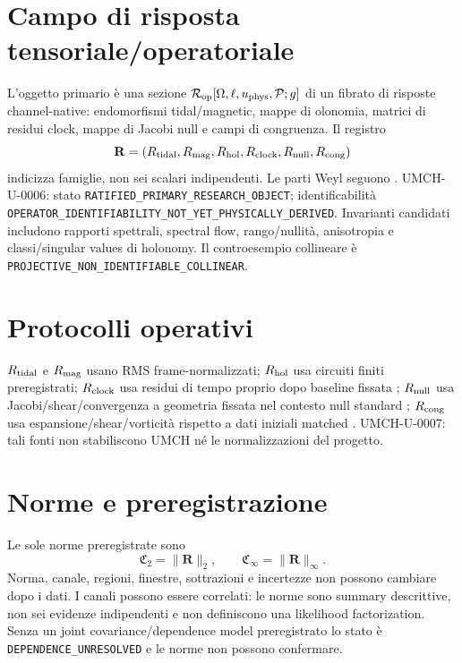 \documentclass[11pt,a4paper]{article}
\begin{document}
\section{Campo di risposta tensoriale/operatoriale}\label{sec:u-response}
L'oggetto primario è una sezione $\mathcal R_{\rm op}[\Omega,\ell,u_{\rm phys},\mathcal P;g]$ di un fibrato di risposte channel-native: endomorfismi tidal/magnetic, mappe di olonomia, matrici di residui clock, mappe di Jacobi null e campi di congruenza. Il registro
\begin{equation}\label{eq:u-vector}\mathbf R=(R_{\rm tidal},R_{\rm mag},R_{\rm hol},R_{\rm clock},R_{\rm null},R_{\rm cong})\end{equation}
indicizza famiglie, non sei scalari indipendenti. Le parti Weyl seguono \cite{Bonnor1995,MaartensBassett1998}. UMCH-U-0006: stato \verb|RATIFIED_PRIMARY_RESEARCH_OBJECT|; identificabilità \verb|OPERATOR_IDENTIFIABILITY_NOT_YET_PHYSICALLY_DERIVED|. Invarianti candidati includono rapporti spettrali, spectral flow, rango/nullità, anisotropia e classi/singular values di holonomy. Il controesempio collineare è \verb|PROJECTIVE_NON_IDENTIFIABLE_COLLINEAR|.

\section{Protocolli operativi}\label{sec:u-protocols}
$R_{\rm tidal}$ e $R_{\rm mag}$ usano RMS frame-normalizzati; $R_{\rm hol}$ usa circuiti finiti preregistrati; $R_{\rm clock}$ usa residui di tempo proprio dopo baseline fissata \cite{PetitWolf2005}; $R_{\rm null}$ usa Jacobi/shear/convergenza a geometria fissata nel contesto null standard \cite{Sachs1961}; $R_{\rm cong}$ usa espansione/shear/vorticità rispetto a dati iniziali matched \cite{Raychaudhuri1955}. UMCH-U-0007: tali fonti non stabiliscono UMCH né le normalizzazioni del progetto.

\section{Norme e preregistrazione}\label{sec:u-norms}
Le sole norme preregistrate sono
\begin{equation}\label{eq:u-norms}\mathfrak C_2=\|\mathbf R\|_2,\qquad \mathfrak C_\infty=\|\mathbf R\|_\infty.\end{equation}
Norma, canale, regioni, finestre, sottrazioni e incertezze non possono cambiare dopo i dati. I canali possono essere correlati: le norme sono summary descrittive, non sei evidenze indipendenti e non definiscono una likelihood factorization. Senza un joint covariance/dependence model preregistrato lo stato è \verb|DEPENDENCE_UNRESOLVED| e le norme non possono confermare.
\end{document}
